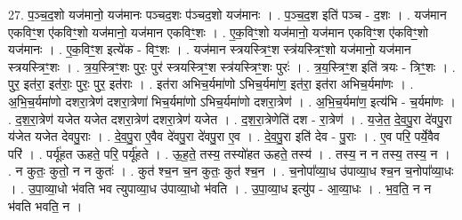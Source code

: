\documentclass[17pt]{extarticle}
\begin{document}
27. प॒ञ्च॒द॒शो यज॑मानो॒ यज॑मानः पञ्चद॒शः प॑ञ्चद॒शो यज॑मानः । . प॒ञ्च॒द॒श इति॑ पञ्च - द॒शः । . यज॑मान एकविꣳ॒॒श ए॑कविꣳ॒॒शो यज॑मानो॒ यज॑मान एकविꣳ॒॒शः । . ए॒क॒विꣳ॒॒शो यज॑मानो॒ यज॑मान एकविꣳ॒॒श ए॑कविꣳ॒॒शो यज॑मानः । . ए॒क॒विꣳ॒॒श इत्ये॑क - विꣳ॒॒शः । . यज॑मान स्त्रयस्त्रिꣳ॒॒श स्त्र॑यस्त्रिꣳ॒॒शो यज॑मानो॒ यज॑मान स्त्रयस्त्रिꣳ॒॒शः । . त्र॒य॒स्त्रिꣳ॒॒शः पुरः॒ पुर॑ स्त्रयस्त्रिꣳ॒॒श स्त्र॑यस्त्रिꣳ॒॒शः पुरः॑ । . त्र॒य॒स्त्रिꣳ॒॒श इति॑ त्रयः - त्रिꣳ॒॒शः । . पुर॒ इत॑रा॒ इत॑राः॒ पुरः॒ पुर॒ इत॑राः । . इत॑रा अभिच॒र्यमा॑णो ऽभिच॒र्यमा॑ण॒ इत॑रा॒ इत॑रा अभिच॒र्यमा॑णः । . अ॒भि॒च॒र्यमा॑णो दशरा॒त्रेण॑ दशरा॒त्रेणा॑ भिच॒र्यमा॑णो ऽभिच॒र्यमा॑णो दशरा॒त्रेण॑ । . अ॒भि॒च॒र्यमा॑ण॒ इत्य॑भि - च॒र्यमा॑णः । . द॒श॒रा॒त्रेण॑ यजेत यजेत दशरा॒त्रेण॑ दशरा॒त्रेण॑ यजेत । . द॒श॒रा॒त्रेणेति॑ दश - रा॒त्रेण॑ । . य॒जे॒त॒ दे॒व॒पु॒रा दे॑वपु॒रा य॑जेत यजेत देवपु॒राः । . दे॒व॒पु॒रा ए॒वैव दे॑वपु॒रा दे॑वपु॒रा ए॒व । . दे॒व॒पु॒रा इति॑ देव - पु॒राः । . ए॒व परि॒ पर्ये॒वैव परि॑ । . पर्यू॑हत ऊहते॒ परि॒ पर्यू॑हते । . ऊ॒ह॒ते॒ तस्य॒ तस्यो॑हत ऊहते॒ तस्य॑ । . तस्य॒ न न तस्य॒ तस्य॒ न । . न कुतः॒ कुतो॒ न न कुतः॑ । . कुत॑ श्च॒न च॒न कुतः॒ कुत॑ श्च॒न । . च॒नोपा᳚व्या॒ध उ॑पाव्या॒ध श्च॒न च॒नोपा᳚व्या॒धः । . उ॒पा॒व्या॒धो भ॑वति भव त्युपाव्या॒ध उ॑पाव्या॒धो भ॑वति । . उ॒पा॒व्या॒ध इत्यु॑प - आ॒व्या॒धः । . भ॒व॒ति॒ न न भ॑वति भवति॒ न । \newline
\end{document}
